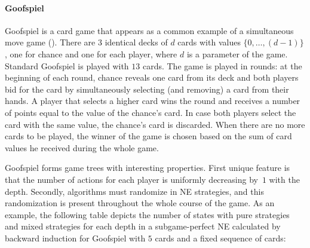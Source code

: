 \paragraph{\textbf{Goofspiel}}
Goofspiel is a card game that appears as a common example of a simultaneous move game (\eg \cite{Ross71Goofspiel,Rhoads12Computer,Saffidine12SMAB,Lanctot13Goofspiel}).
There are $3$ identical decks of $d$ cards with values $\{0,\dots, (d-1)\}$, one for chance and one for each player, 
where $d$ is a parameter of the game. 
Standard Goofspiel is played with $13$ cards.
The game is played in rounds: at the beginning of each round, chance reveals one card from its deck and both players bid for the card by simultaneously selecting (and removing) a card from their hands.
A player that selects a higher card wins the round and receives a number of points equal to the value of the chance's card.
In case both players select the card with the same value, the chance's card is discarded.
When there are no more cards to be played, the winner of the game is chosen based on the sum of card values he received during the whole game.


Goofspiel forms game trees with interesting properties.
First unique feature is that the number of actions for each player is uniformly decreasing by~$1$ with the depth.
Secondly, algorithms must randomize in NE strategies, and this randomization is present throughout the whole course of the game.
As an example, the following table depicts the number of states with pure strategies and mixed strategies for each depth in a subgame-perfect NE calculated by backward induction for Goofspiel with $5$ cards and a fixed sequence of cards:

